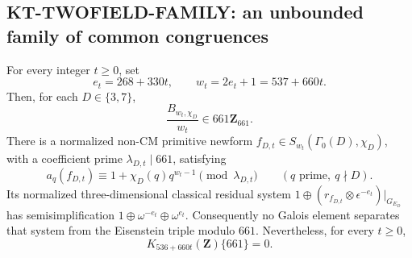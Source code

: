 \subsection{KT-TWOFIELD-FAMILY: an unbounded family of common congruences}
\label{sec:kt-twofield-family}

\begin{proposition}
For every integer $t\geq0$, set
\[
            e_t=268+330t,\qquad w_t=2e_t+1=537+660t.
                                                               \tag{TI.1}
\]
Then, for each $D\in\{3,7\}$,
\[
        \frac{B_{w_t,\chi_D}}{w_t}\in661\mathbf Z_{661}.
                                                               \tag{TI.2}
\]
There is a normalized non-CM primitive newform
$f_{D,t}\in S_{w_t}(\Gamma_0(D),\chi_D)$, with a
coefficient prime $\lambda_{D,t}\mid661$, satisfying
\[
 a_q(f_{D,t})\equiv1+\chi_D(q)q^{w_t-1}
          \pmod{\lambda_{D,t}}
                 \qquad(q\text{ prime},\ q\nmid D).
                                                               \tag{TI.3}
\]
Its normalized three-dimensional classical residual system
$1\oplus(r_{f_{D,t}}\otimes\epsilon^{-e_t})|_{G_{E_D}}$
has semisimplification
$1\oplus\omega^{-e_t}\oplus\omega^{e_t}$.
Consequently no Galois element separates that system from
the Eisenstein triple modulo $661$.
Nevertheless, for every $t\geq0$,
\[
                    K_{536+660t}(\mathbf Z)\{661\}=0.
                                                               \tag{TI.5}
\]
\end{proposition}

